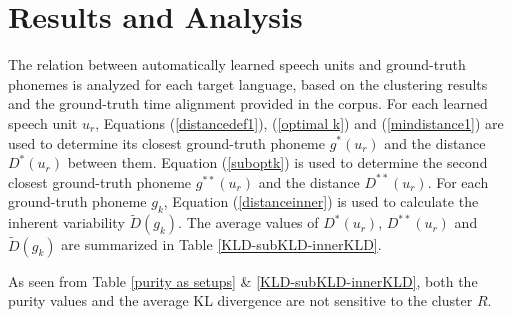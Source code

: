 \documentclass[a4paper]{article}
\begin{document}
\section{Results and Analysis}
The relation between automatically learned speech units and ground-truth phonemes is analyzed for each target language, based on the clustering results and the ground-truth time alignment provided in the corpus. For each learned speech unit $u_r$, Equations (\ref{distancedef1}), (\ref{optimal k}) and (\ref{mindistance1}) are used to determine its closest ground-truth phoneme $g^* (u_r)$ and the distance $D^* (u_r)$ between them. Equation (\ref{suboptk}) is used to determine the second closest ground-truth phoneme $g^{**} (u_r)$ and the distance $D^{**} (u_r)$. For each ground-truth phoneme $g_k$, Equation (\ref{distanceinner}) is used to calculate the inherent variability $\widetilde{D}(g_k)$. 
The average values of $D^* (u_r)$, $D^{**} (u_r)$ and $\widetilde{D} (g_k)$ are summarized in Table \ref{KLD-subKLD-innerKLD}.
\begin{table}[htbp]
  \centering
    \caption{$\overline{D^* (u_r)}/\overline{D^{** }(u_r)}$ and $\overline{\widetilde{D}(g_k)}$}
    \renewcommand\arraystretch{1.0}
  \label{KLD-subKLD-innerKLD}
\end{table}
As seen from Table \ref{purity as setups} \& \ref{KLD-subKLD-innerKLD}, both the purity values and the average KL divergence are not sensitive to the cluster $R$.
\end{document}
